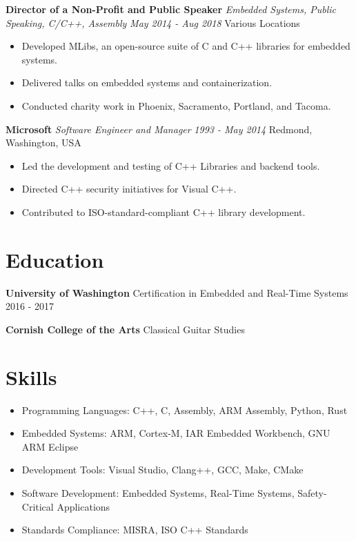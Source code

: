 \documentclass[a4paper,10pt]{article}
\begin{document}
\textbf{Director of a Non-Profit and Public Speaker}  
\emph{Embedded Systems, Public Speaking, C/C++, Assembly}  
\textit{May 2014 - Aug 2018}  
Various Locations
\begin{itemize}[leftmargin=1cm]
    \item Developed MLibs, an open-source suite of C and C++ libraries for embedded systems.
    \item Delivered talks on embedded systems and containerization.
    \item Conducted charity work in Phoenix, Sacramento, Portland, and Tacoma.
\end{itemize}

\textbf{Microsoft}  
\emph{Software Engineer and Manager}  
\textit{1993 - May 2014}  
Redmond, Washington, USA
\begin{itemize}[leftmargin=1cm]
    \item Led the development and testing of C++ Libraries and backend tools.
    \item Directed C++ security initiatives for Visual C++.
    \item Contributed to ISO-standard-compliant C++ library development.
\end{itemize}

\section*{Education}

\textbf{University of Washington}  
Certification in Embedded and Real-Time Systems  
2016 - 2017

\textbf{Cornish College of the Arts}  
Classical Guitar Studies

\section*{Skills}
\begin{itemize}[leftmargin=1cm]
    \item Programming Languages: C++, C, Assembly, ARM Assembly, Python, Rust
    \item Embedded Systems: ARM, Cortex-M, IAR Embedded Workbench, GNU ARM Eclipse
    \item Development Tools: Visual Studio, Clang++, GCC, Make, CMake
    \item Software Development: Embedded Systems, Real-Time Systems, Safety-Critical Applications
    \item Standards Compliance: MISRA, ISO C++ Standards
\end{itemize}
\end{document}
